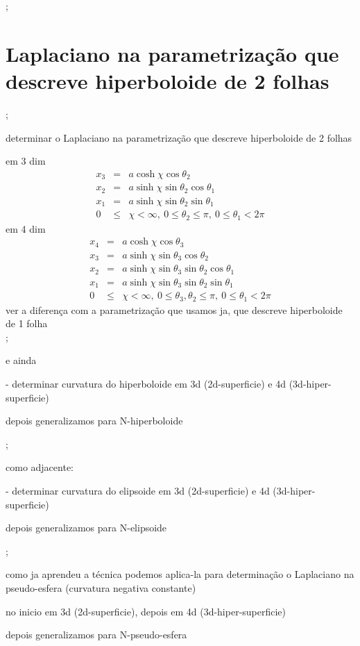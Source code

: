 \documentclass[a4paper,12pt]{article}
\begin{document}
;

\section{Laplaciano na parametriza\c{c}\~{a}o que descreve hiperboloide de 2
folhas}

;

determinar o Laplaciano na parametriza\c{c}\~{a}o que descreve hiperboloide
de 2 folhas

em 3 dim%
\begin{eqnarray*}
x_{3} &=&a\cosh \chi \cos \theta _{2} \\
x_{2} &=&a\sinh \chi \sin \theta _{2}\cos \theta _{1} \\
x_{1} &=&a\sinh \chi \sin \theta _{2}\sin \theta _{1} \\
0 &\leq &\chi <\infty ,\ 0\leq \theta _{2}\leq \pi ,\ 0\leq \theta _{1}<2\pi 
\end{eqnarray*}%
em 4 dim%
\begin{eqnarray*}
x_{4} &=&a\cosh \chi \cos \theta _{3} \\
x_{3} &=&a\sinh \chi \sin \theta _{3}\cos \theta _{2} \\
x_{2} &=&a\sinh \chi \sin \theta _{3}\sin \theta _{2}\cos \theta _{1} \\
x_{1} &=&a\sinh \chi \sin \theta _{3}\sin \theta _{2}\sin \theta _{1} \\
0 &\leq &\chi <\infty ,\ 0\leq \theta _{3},\theta _{2}\leq \pi ,\ 0\leq
\theta _{1}<2\pi 
\end{eqnarray*}%
ver a diferen\c{c}a com a parametriza\c{c}\~{a}o que usamos ja, que descreve
hiperboloide de 1 folha%
\begin{equation*}
\end{equation*}%
;

e ainda

- determinar curvatura do hiperboloide em 3d (2d-superficie) e 4d
(3d-hiper-superficie)

depois generalizamos para N-hiperboloide

;

como adjacente:

- determinar curvatura do elipsoide em 3d (2d-superficie) e 4d
(3d-hiper-superficie)

depois generalizamos para N-elipsoide

;

como ja aprendeu a t\'{e}cnica podemos aplica-la para determina\c{c}\~{a}o o
Laplaciano na pseudo-esfera (curvatura negativa constante)

no inicio em 3d (2d-superficie), depois em 4d (3d-hiper-superficie)

depois generalizamos para N-pseudo-esfera
\end{document}

